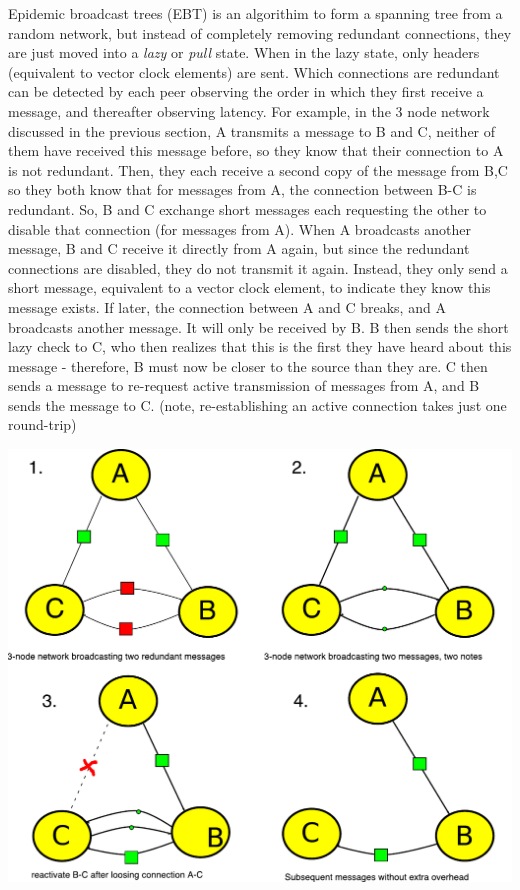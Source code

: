 \documentclass[sigconf]{acmart}
\begin{document}
Epidemic broadcast trees (EBT) is an algorithim to form a spanning
tree from a random network, but instead of completely removing
redundant connections, they are just moved into a {\em lazy} or {\em
  pull} state. When in the lazy state, only headers (equivalent to
vector clock elements) are sent. Which connections are redundant can
be detected by each peer observing the order in which they first
receive a message, and thereafter observing latency. For example, in
the 3 node network discussed in the previous section, A transmits a
message to B and C, neither of them have received this message before,
so they know that their connection to A is not redundant. Then, they
each receive a second copy of the message from B,C so they both know
that for messages from A, the connection between B-C is redundant.
So, B and C exchange short messages each requesting the other to
disable that connection (for messages from A). When A broadcasts
another message, B and C receive it directly from A again, but since
the redundant connections are disabled, they do not transmit it
again. Instead, they only send a short message, equivalent to a vector
clock element, to indicate they know this message exists. If later,
the connection between A and C breaks, and A broadcasts another
message. It will only be received by B.  B then sends the short lazy
check to C, who then realizes that this is the first they have heard
about this message - therefore, B must now be closer to the source
than they are.  C then sends a message to re-request active
transmission of messages from A, and B sends the message to C. (note,
re-establishing an active connection takes just one round-trip)

\includegraphics[width=0.9\columnwidth]{figs/redundant.pdf}
\end{document}
